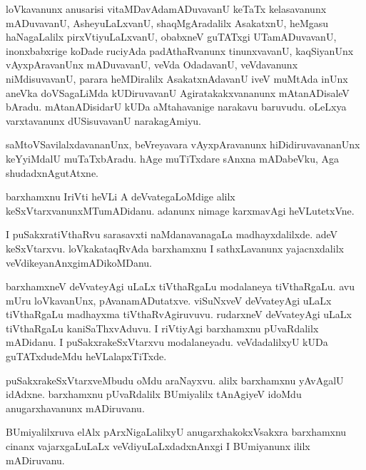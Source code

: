 \documentclass{article}
\begin{document}
\begin{mn}
loVkavanunx anusarisi vitaMDavAdamADuvavanU keTaTx kelasavanunx
mADuvavanU, AsheyuLaLxvanU, shaqMgAradalilx AsakatxnU, heMgasu
haNagaLalilx pirxVtiyuLaLxvanU, obabxneV guTATxgi UTamADuvavanU,
inonxbabxrige koDade ruciyAda padAthaRvanunx tinunxvavanU, kaqSiyanUnx
vAyxpAravanUnx mADuvavanU, veVda OdadavanU, veVdavanunx niMdisuvavanU,
parara heMDiralilx AsakatxnAdavanU iveV muMtAda inUnx aneVka
doVSagaLiMda kUDiruvavanU Agiratakakxvananunx mAtanADisaleV
bAradu. mAtanADisidarU kUDa aMtahavanige narakavu baruvudu. oLeLxya
varxtavanunx dUSisuvavanU narakagAmiyu.
\end{mn}

\begin{mn}%
saMtoVSavilalxdavananUnx, beVreyavara vAyxpAravanunx
hiDidiruvavananUnx keYyiMdalU muTaTxbAradu. hAge muTiTxdare sAnxna
mADabeVku, Aga shudadxnAgutAtxne.
\end{mn}

\begin{mn}
barxhamxnu IriVti heVLi A deVvategaLoMdige alilx
keSxVtarxvanunxMTumADidanu. adanunx nimage karxmavAgi heVLutetxVne.
\end{mn}

\begin{mn}
I puSakxratiVthaRvu sarasavxti naMdanavanagaLa madhayxdalilxde. adeV
keSxVtarxvu. loVkakataqRvAda barxhamxnu I sathxLavanunx yajacnxdalilx
veVdikeyanAnxgimADikoMDanu.
\end{mn}

\begin{mn}%
barxhamxneV deVvateyAgi uLaLx tiVthaRgaLu modalaneya tiVthaRgaLu. avu
mUru loVkavanUnx, pAvanamADutatxve. viSuNxveV deVvateyAgi uLaLx
tiVthaRgaLu madhayxma tiVthaRvAgiruvuvu. rudarxneV deVvateyAgi uLaLx
tiVthaRgaLu kaniSaThxvAduvu. I riVtiyAgi barxhamxnu pUvaRdalilx
mADidanu. I puSakxrakeSxVtarxvu modalaneyadu. veVdadalilxyU kUDa
guTATxdudeMdu heVLalapxTiTxde.
\end{mn}

\begin{mn}
puSakxrakeSxVtarxveMbudu oMdu araNayxvu. alilx barxhamxnu yAvAgalU
idAdxne. barxhamxnu pUvaRdalilx BUmiyalilx tAnAgiyeV idoMdu
anugarxhavanunx mADiruvanu.
\end{mn}

\begin{mn}
BUmiyalilxruva elAlx pArxNigaLalilxyU anugarxhakokxVsakxra barxhamxnu
cinanx vajarxgaLuLaLx veVdiyuLaLxdadxnAnxgi I BUmiyanunx ililx mADiruvanu.
\end{mn}
\end{document}
